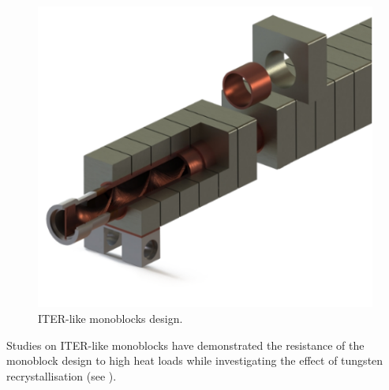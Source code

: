 \begin{figure} [h]
    \centering
    \includegraphics[width=0.5\linewidth]{Figures/Chapter1/monoblocks_with_pipe.png}
    \caption{ITER-like monoblocks design.}
    \label{fig: monoblocks with pipe}
\end{figure}

Studies on ITER-like monoblocks have demonstrated the resistance of the monoblock design to high heat loads while investigating the effect of tungsten recrystallisation  (see ).


